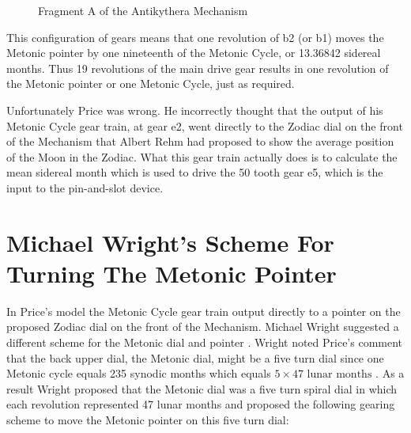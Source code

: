 \documentclass[11pt, oneside]{article}   	%
\theoremstyle{definition}
\begin{document}
\bigskip
\begin{figure}[H]
\caption{Fragment A of the Antikythera Mechanism \cite{wiki:fragmentA}}
\label{fig:fragmentA}
\end{figure}

\bigskip
\noindent
This configuration of gears means that one revolution of b2 (or b1) moves the Metonic pointer by one nineteenth of the Metonic Cycle, 
or 13.36842 sidereal months. Thus 19 revolutions of the main drive gear results in one revolution of the Metonic pointer or one Metonic Cycle, 
just as required.

\bigskip
\noindent
Unfortunately Price was wrong. He incorrectly thought that the output of his Metonic Cycle gear train, at gear e2,  went directly to the Zodiac dial 
on the front of the Mechanism that Albert Rehm \cite{wiki:rehm} had proposed to show the average position of the Moon in the Zodiac. What this
gear train actually does is to calculate the mean sidereal month which is used to drive the 50 tooth gear e5, which is the input to 
the pin-and-slot device.

\section{Michael Wright's Scheme For Turning The Metonic Pointer}
In Price's model the Metonic Cycle gear train output directly to a pointer on the proposed Zodiac dial on the front of the Mechanism. Michael Wright suggested 
a different scheme for the Metonic dial and pointer \cite{Wright2005a}. Wright noted Price's comment that the back upper dial, the Metonic 
dial, might be a five turn dial since  one Metonic cycle equals 235 synodic months which equals $5 \times 47 \text{ lunar months}$ \cite{gears_from_the_greeks}.
As a result Wright proposed that the Metonic dial was a five turn spiral dial in which each revolution represented 47 lunar months and  proposed the following 
gearing scheme to move the Metonic pointer on this five turn dial:
\end{document}
